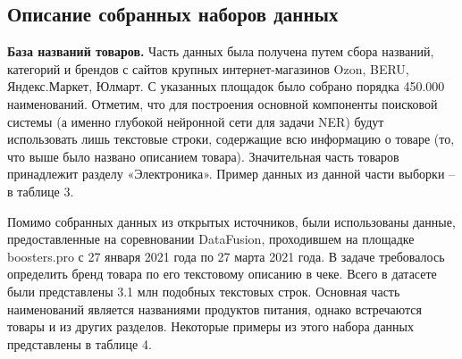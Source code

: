 \documentclass[12pt,a4paper]{article}
\begin{document}
\subsection{Описание собранных наборов данных}

\textbf{База названий товаров.} Часть данных была получена путем сбора названий, категорий и брендов с сайтов крупных интернет-магазинов Ozon, BERU, Яндекс.Маркет, Юлмарт. С указанных площадок было собрано порядка 450.000 наименований. Отметим, что для построения основной компоненты поисковой системы (а именно глубокой нейронной сети для задачи NER) будут использовать лишь текстовые строки, содержащие всю информацию о товаре (то, что выше было названо описанием товара). Значительная часть товаров принадлежит разделу «Электроника». Пример данных из данной части выборки -- в таблице 3.

\begin{table}[H]
\begin{center}
    \caption{Примеры товаров с сайтов с Ozon, BERU, Яндекс.Маркет, Юлмарт}
\end{center}
\end{table}


\noindent Помимо собранных данных из открытых источников, были использованы данные, предоставленные на соревновании DataFusion, проходившем на площадке boosters.pro с 27 января 2021 года по 27 марта 2021 года. В задаче требовалось определить бренд товара по его текстовому описанию в чеке. Всего в датасете были представлены 3.1 млн подобных текстовых строк. Основная часть наименований является названиями продуктов питания, однако встречаются товары и из других разделов. Некоторые примеры из этого набора данных представлены в таблице 4.
\end{document}
